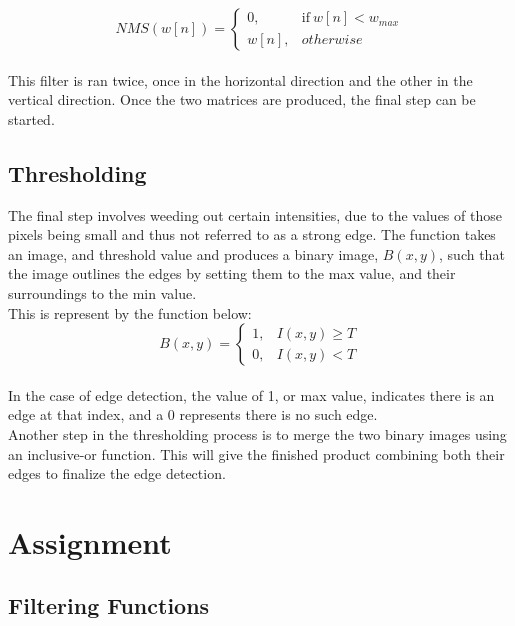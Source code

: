\documentclass{article}
\begin{document}
	 \begin{equation}
	 NMS(w[n]) = \begin{cases} 
	 0, & \mbox{if}\ w[n] < w_{max}\\
	 w[n], & otherwise 
	 \end{cases} 
	 \end{equation}
	 \\
	
	This filter is ran twice, once in the horizontal direction and the other in the vertical direction. Once the two matrices are produced, the final step can be started.
	
	\subsection{Thresholding}
	
	The final step involves weeding out certain intensities, due to the values of those pixels being small and thus not referred to as a strong edge. The function takes an image, and threshold value and produces a binary image, $B(x,y)$, such that the image outlines the edges by setting them to the max value, and their surroundings to the min value.\\
	
	This is represent by the function below:\\
	
	\begin{equation}
		B(x,y) = \begin{cases} 
		1, & I(x,y) \geq T\\
		0, & I(x,y) < T
		\end{cases} 
	\end{equation}\\
	
	In the case of edge detection, the value of 1, or max value, indicates there is an edge at that index, and a 0 represents there is no such edge.\\
	
	Another step in the thresholding process is to merge the two binary images using an inclusive-or function. This will give the finished product combining both their edges to finalize the edge detection.
	
	\section{Assignment}
	
	\subsection{Filtering Functions}
	
\end{document}
